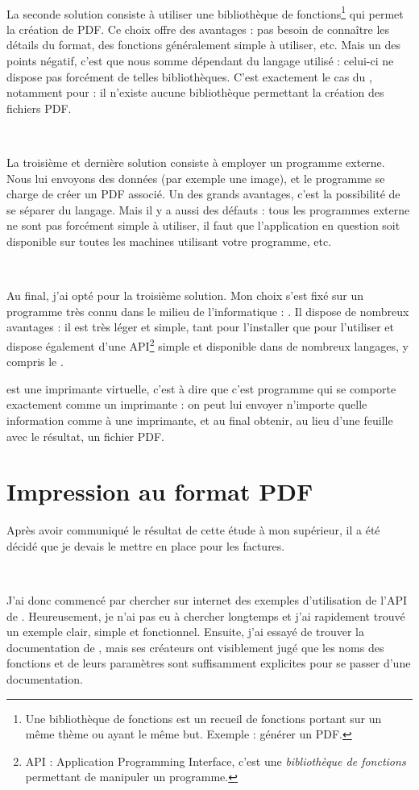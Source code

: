 ~

La seconde solution consiste à utiliser une bibliothèque de fonctions\footnote{Une bibliothèque de fonctions est un recueil de fonctions portant sur un même thème ou ayant le même but. Exemple : générer un PDF.} qui permet la création de PDF. Ce choix offre des avantages : pas besoin de connaître les détails du format, des fonctions généralement simple à utiliser, etc. Mais un des points négatif, c'est que nous somme dépendant du langage utilisé : celui-ci ne dispose pas forcément de telles bibliothèques. C'est exactement le cas du \vb, notamment pour  : il n'existe aucune bibliothèque permettant la création des fichiers PDF.

~

La troisième et dernière solution consiste à employer un programme externe. Nous lui envoyons des données (par exemple une image), et le programme se charge de créer un PDF associé. Un des grands avantages, c'est la possibilité de se séparer du langage. Mais il y a aussi des défauts : tous les programmes externe ne sont pas forcément simple à utiliser, il faut que l'application en question soit disponible sur toutes les machines utilisant votre programme, etc.

~

Au final, j'ai opté pour la troisième solution. Mon choix s'est fixé sur un programme très connu dans le milieu de l'informatique : \pdfcreator. Il dispose de nombreux avantages : il est très léger et simple, tant pour l'installer que pour l'utiliser et dispose également d'une API\footnote{API : Application Programming Interface, c'est une \emph{bibliothèque de fonctions} permettant de manipuler un programme.} simple et disponible dans de nombreux langages, y compris le \vb.

\pdfcreator{} est une imprimante virtuelle, c'est à dire que c'est programme qui se comporte exactement comme un imprimante : on peut lui envoyer n'importe quelle information comme à une imprimante, et au final obtenir, au lieu d'une feuille avec le résultat, un fichier PDF.

\section{Impression au format PDF}
Après avoir communiqué le résultat de cette étude à mon supérieur, il a été décidé que je devais le mettre en place pour les factures.

~

J'ai donc commencé par chercher sur internet des exemples d'utilisation de l'API de \pdfcreator. Heureusement, je n'ai pas eu à chercher longtemps et j'ai rapidement trouvé un exemple clair, simple et fonctionnel. Ensuite, j'ai essayé de trouver la documentation de \pdfcreator, mais ses créateurs ont visiblement jugé que les noms des fonctions et de leurs paramètres sont suffisamment explicites pour se passer d'une documentation.

